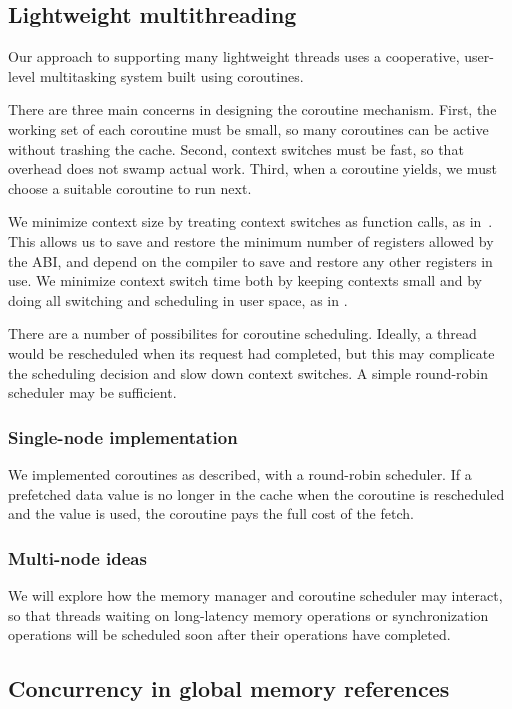 \documentclass[10pt,nocopyrightspace,preprint]{sigplanconf}
\begin{document}
\subsection{Lightweight multithreading}

Our approach to supporting many lightweight threads uses a cooperative,
user-level multitasking system built using coroutines.

There are three main concerns in designing the coroutine
mechanism. First, the working set of each coroutine must be small, so
many coroutines can be active without trashing the cache. Second,
context switches must be fast, so that overhead does not swamp actual
work. Third, when a coroutine yields, we must choose a suitable
coroutine to run next.

We minimize context size by treating context switches as function
calls, as in~\cite{charm}. This allows us to save and restore the
minimum number of registers allowed by the ABI, and depend on the
compiler to save and restore any other registers in use. We minimize
context switch time both by keeping contexts small and by doing all
switching and scheduling in user space, as in .

There are a number of possibilites for coroutine scheduling.
Ideally, a thread would be rescheduled when its request had
completed, but this may complicate the scheduling decision and slow
down context switches. A simple round-robin scheduler may be sufficient.

\subsubsection{Single-node implementation}
We implemented coroutines as described, with a round-robin
scheduler. If a prefetched data value is no longer in the cache when
the coroutine is rescheduled and the value is used, the coroutine pays
the full cost of the fetch.

\subsubsection{Multi-node ideas}
We will explore how the memory manager and coroutine scheduler may
interact, so that threads waiting on long-latency memory operations or
synchronization operations will be scheduled soon after their
operations have completed. 

\subsection{Concurrency in global memory references}
\end{document}
